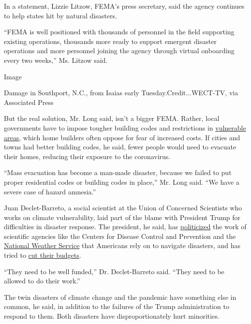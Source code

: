 In a statement, Lizzie Litzow, FEMA's press secretary, said the agency
continues to help states hit by natural disasters.

``FEMA is well positioned with thousands of personnel in the field
supporting existing operations, thousands more ready to support emergent
disaster operations and more personnel joining the agency through
virtual onboarding every two weeks,'' Ms. Litzow said.

Image

Damage in Southport, N.C., from Isaias early Tuesday.Credit...WECT-TV,
via Associated Press

But the real solution, Mr. Long said, isn't a bigger FEMA. Rather, local
governments have to impose tougher building codes and restrictions in
\href{https://www.bloomberg.com/news/articles/2018-11-14/california-s-wildfire-epidemic-blamed-on-bad-building-decisions?sref=UBrhZ1ro}{vulnerable
areas}, which home builders often oppose for fear of increased costs. If
cities and towns had better building codes, he said, fewer people would
need to evacuate their homes, reducing their exposure to the
coronavirus.

``Mass evacuation has become a man-made disaster, because we failed to
put proper residential codes or building codes in place,'' Mr. Long
said. ``We have a severe case of hazard amnesia.''

Juan Declet-Barreto, a social scientist at the Union of Concerned
Scientists who works on climate vulnerability, laid part of the blame
with President Trump for difficulties in disaster response. The
president, he said, has
\href{https://www.nytimes3xbfgragh.onion/2020/07/09/climate/trump-hurricane-dorian-noaa.html}{politicized}
the work of scientific agencies like the Centers for Disease Control and
Prevention and the
\href{https://www.nytimes3xbfgragh.onion/2019/09/13/climate/trump-noaa-hurricane-tweet.html}{National
Weather Service} that Americans rely on to navigate disasters, and has
tried to
\href{https://www.sciencemag.org/news/2020/02/trump-s-new-budget-cuts-all-favored-few-science-programs}{cut
their budgets}.

``They need to be well funded,'' Dr. Declet-Barreto said. ``They need to
be allowed to do their work.''

The twin disasters of climate change and the pandemic have something
else in common, he said, in addition to the failures of the Trump
administration to respond to them. Both disasters have
disproportionately hurt minorities.

